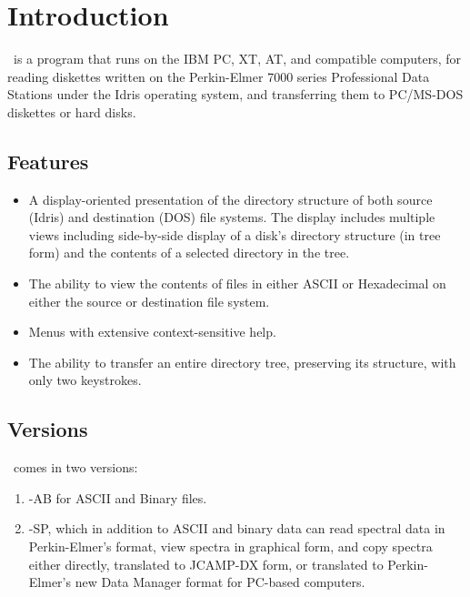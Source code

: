 \chapter{Introduction}
 
\RD\ is a program that runs on the IBM PC, XT, AT, and compatible
computers, for reading diskettes written on the Perkin-Elmer 7000 series
Professional Data Stations under the Idris operating system,
and transferring them to PC/MS-DOS diskettes or hard disks. 


\section{Features}
 
\begin{itemize}
\item
A display-oriented presentation of the directory structure of both
source (Idris) and destination (DOS) file systems.  The display
includes multiple views including side-by-side display of a disk's
directory structure (in tree form) and the contents of a selected
directory in the tree.
 
\item
The ability to view the contents of files in either ASCII or
Hexadecimal on either the source or destination file system.
 
\item
Menus with extensive context-sensitive help.
 
\item
The ability to transfer an entire directory tree, preserving its
structure, with only two keystrokes.
 
\end{itemize}

\newpage
\section{Versions}
 
\RD\ comes in two versions:
 
\begin{enumerate}
 
\item \RD-AB for ASCII and Binary files.
 
\item \RD-SP, which in addition to ASCII and binary data
can read spectral data in Perkin-Elmer's
 format, view spectra in graphical form, and copy spectra
either directly, translated to JCAMP-DX form, or translated to
Perkin-Elmer's new Data Manager format for PC-based computers.
 
\end{enumerate}
 
